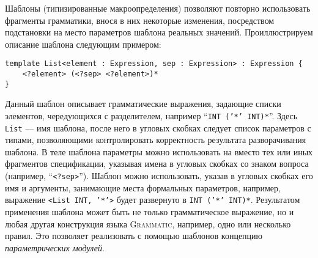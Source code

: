 \documentclass[12pt,a4paper]{article}
\newcommand{\term}[1]{\emph{#1}}
\newcommand{\code}[1]{\mbox{\texttt{#1}}}
\newcommand{\tool}[1]{\textsc{#1}}
\theoremstyle{definition}
\theoremstyle{plain}
\newcommand{\GRM}{\tool{Grammatic}}
\begin{document}
Шаблоны (типизированные макроопределения) позволяют повторно использовать фрагменты грамматики, внося в них некоторые изменения, посредством подстановки на место параметров шаблона реальных значений. Проиллюстрируем описание шаблона следующим примером:
\begin{lstlisting}
template List<element : Expression, sep : Expression> : Expression {
	<?element> (<?sep> <?element>)*
}
\end{lstlisting}
Данный шаблон описывает грамматические выражения, задающие списки элементов, чередующихся с разделителем, например ``\code{INT ('*' INT)*}''. Здесь \code{List} --- имя шаблона, после него в угловых скобках следует список параметров с типами, позволяющими контролировать корректность результата разворачивания шаблона. В теле шаблона параметры можно использовать на вместо тех или иных фрагментов спецификации, указывая имена в угловых скобках со знаком вопроса (например, ``\code{<?sep>}''). Шаблон можно использовать, указав в угловых скобках его имя и аргументы, занимающие места формальных параметров, например, выражение \code{<List INT, '*'>} будет развернуто в \code{INT ('*' INT)*}. Результатом применения шаблона может быть не только грамматическое выражение, но и любая другая конструкция языка \GRM{}, например, одно или несколько правил. Это позволяет реализовать с помощью шаблонов концепцию \term{параметрических модулей}. 
\end{document}
